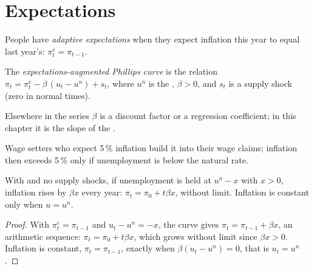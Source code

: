 \section{Expectations}\label{sec:g12:phillips-curve:expectations}

\begin{definition}\label{def:g12:phillips-curve:adaptive}
People have \emph{adaptive expectations} when they expect inflation this year to equal last year's: $\pi^e_t = \pi_{t-1}$.
\end{definition}

\begin{definition}\label{def:g12:phillips-curve:augmented}
The \emph{expectations-augmented Phillips curve} is the relation $\pi_t = \pi^e_t - \beta\,(u_t - u^n) + s_t$, where $u^n$ is the
, $\beta > 0$, and $s_t$ is a supply shock (zero in normal times).
\end{definition}

\begin{notation}\label{not:g12:phillips-curve:beta}
Elsewhere in the series $\beta$ is a discount factor or a regression coefficient; in this chapter it is the slope of the .
\end{notation}

Wage setters who expect 5\,\% inflation build it into their wage claims; inflation then exceeds 5\,\% only if unemployment is below the natural rate.

\begin{proposition}\label{prop:g12:phillips-curve:no-trade-off}
With  and no supply shocks, if unemployment is held at $u^n - x$ with $x > 0$, inflation rises by $\beta x$ every year: $\pi_t = \pi_0 + t\beta x$, without
limit. Inflation is constant only when $u = u^n$.
\end{proposition}
\begin{proof}
With $\pi^e_t = \pi_{t-1}$ and $u_t - u^n = -x$, the curve gives $\pi_t = \pi_{t-1} + \beta x$, an arithmetic sequence: $\pi_t = \pi_0 + t\beta x$, which grows without
limit since $\beta x > 0$. Inflation is constant, $\pi_t = \pi_{t-1}$, exactly when $\beta(u_t - u^n) = 0$, that is $u_t = u^n$.
\end{proof}

